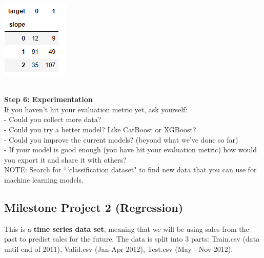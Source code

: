 \documentclass[11pt, a4paper]{article}
\begin{document}
\begin{spacing}{1.1}
\begin{minipage}[c]{8cm}
	\includegraphics[scale=.8]{crosstab2_mp}
	\end{minipage} \vspace*{7mm} \\
	\textbf{Step 6: Experimentation} \\
	If you haven't hit your evaluation metric yet, ask yourself: \vspace*{1mm} \\	
	\hspace*{2mm} - Could you collect more data? \\
	\hspace*{2mm} - Could you try a better model? Like CatBoost or XGBoost? \\
	\hspace*{2mm} - Could you improve the current models? (beyond what we've done so far) \\
	\hspace*{2mm} - If your model is good enough (you have hit your evaluation metric) how would you export it and \hspace*{5mm} share it with others? \vspace*{3mm} \\
	NOTE: Search for ```classification dataset" to find new data that you can use for machine learning models. \newpage

	\subsection{Milestone Project 2 (Regression)}
	This is a \textbf{time series data set}, meaning that we will be using sales from the past to predict sales for the future. The data is split into 3 parts: Train.csv (data until end of 2011), Valid.csv (Jan-Apr 2012), Test.csv (May - Nov 2012). \\~\\
	
	
	
	
	
	
	
	
	
	
	
	
	
		
	\end{spacing}
\end{document}
